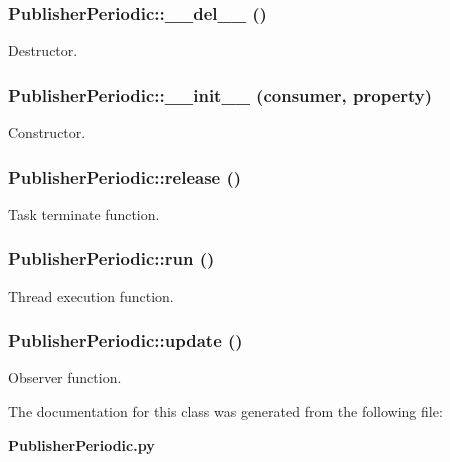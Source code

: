 \subsubsection{\setlength{\rightskip}{0pt plus 5cm}Publisher\-Periodic::\_\-\_\-del\_\-\_\- ()}\label{classPublisherPeriodic_PublisherPeriodica1}


Destructor. 

\subsubsection{\setlength{\rightskip}{0pt plus 5cm}Publisher\-Periodic::\_\-\_\-init\_\-\_\- (consumer, property)}\label{classPublisherPeriodic_PublisherPeriodica0}


Constructor. 

\subsubsection{\setlength{\rightskip}{0pt plus 5cm}Publisher\-Periodic::release ()}\label{classPublisherPeriodic_PublisherPeriodica4}


Task terminate function. 

\subsubsection{\setlength{\rightskip}{0pt plus 5cm}Publisher\-Periodic::run ()}\label{classPublisherPeriodic_PublisherPeriodica3}


Thread execution function. 

\subsubsection{\setlength{\rightskip}{0pt plus 5cm}Publisher\-Periodic::update ()}\label{classPublisherPeriodic_PublisherPeriodica2}


Observer function. 



The documentation for this class was generated from the following file:\begin{CompactItemize}
\item 
{\bf Publisher\-Periodic.py}\end{CompactItemize}
